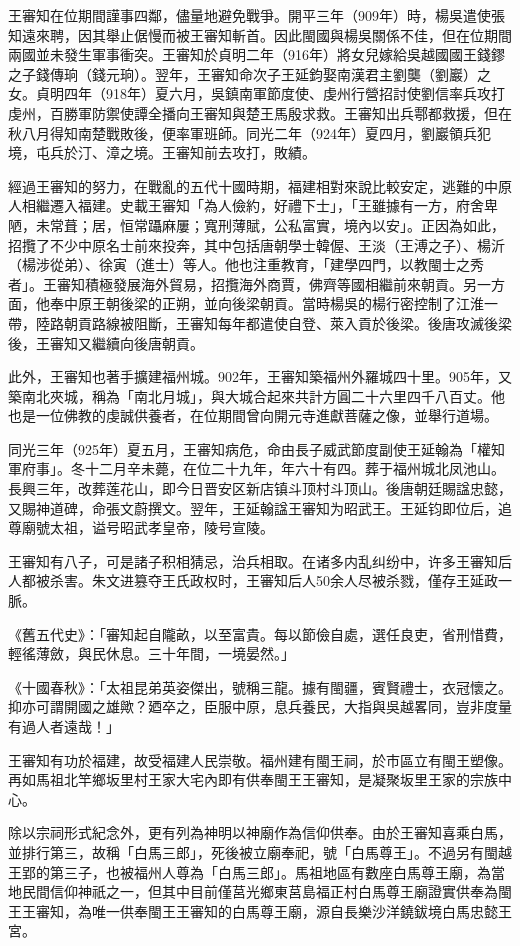 王審知在位期間謹事四鄰，儘量地避免戰爭。開平三年（909年）時，楊吳遣使張知遠來聘，因其舉止倨慢而被王審知斬首。因此閩國與楊吳關係不佳，但在位期間兩國並未發生軍事衝突。王審知於貞明二年（916年）將女兒嫁給吳越國國王錢鏐之子錢傳珦（錢元珦）。翌年，王審知命次子王延鈞娶南漢君主劉龑（劉巖）之女。貞明四年（918年）夏六月，吳鎮南軍節度使、虔州行營招討使劉信率兵攻打虔州，百勝軍防禦使譚全播向王審知與楚王馬殷求救。王審知出兵鄠都救援，但在秋八月得知南楚戰敗後，便率軍班師。同光二年（924年）夏四月，劉巖領兵犯境，屯兵於汀、漳之境。王審知前去攻打，敗績。

經過王審知的努力，在戰亂的五代十國時期，福建相對來說比較安定，逃難的中原人相繼遷入福建。史載王審知「為人儉約，好禮下士」，「王雖據有一方，府舍卑陋，未常葺；居，恒常躡麻屢；寬刑薄賦，公私富實，境內以安」。正因為如此，招攬了不少中原名士前來投奔，其中包括唐朝學士韓偓、王淡（王溥之子）、楊沂（楊涉從弟）、徐寅（進士）等人。他也注重教育，「建學四門，以教閩士之秀者」。王審知積極發展海外貿易，招攬海外商賈，佛齊等國相繼前來朝貢。另一方面，他奉中原王朝後梁的正朔，並向後梁朝貢。當時楊吳的楊行密控制了江淮一帶，陸路朝貢路線被阻斷，王審知每年都遣使自登、萊入貢於後梁。後唐攻滅後梁後，王審知又繼續向後唐朝貢。

此外，王審知也著手擴建福州城。902年，王審知築福州外羅城四十里。905年，又築南北夾城，稱為「南北月城」，與大城合起來共計方圓二十六里四千八百丈。他也是一位佛教的虔誠供養者，在位期間曾向開元寺進獻菩薩之像，並舉行道場。

同光三年（925年）夏五月，王審知病危，命由長子威武節度副使王延翰為「權知軍府事」。冬十二月辛未薨，在位二十九年，年六十有四。葬于福州城北凤池山。長興三年，改葬莲花山，即今日晋安区新店镇斗顶村斗顶山。後唐朝廷賜諡忠懿，又賜神道碑，命張文蔚撰文。翌年，王延翰諡王審知为昭武王。王延钧即位后，追尊廟號太祖，谥号昭武孝皇帝，陵号宣陵。

王審知有八子，可是諸子积相猜忌，治兵相取。在诸多内乱纠纷中，许多王審知后人都被杀害。朱文进篡夺王氏政权时，王審知后人50余人尽被杀戮，僅存王延政一脈。

《舊五代史》：「審知起自隴畝，以至富貴。每以節儉自處，選任良吏，省刑惜費，輕徭薄斂，與民休息。三十年間，一境晏然。」

《十國春秋》：「太祖昆弟英姿傑出，號稱三龍。據有閩疆，賓賢禮士，衣冠懷之。抑亦可謂開國之雄歟？廼卒之，臣服中原，息兵養民，大指與吳越畧同，豈非度量有過人者遠哉！」

王審知有功於福建，故受福建人民崇敬。福州建有閩王祠，於市區立有閩王塑像。再如馬祖北竿鄉坂里村王家大宅內即有供奉閩王王審知，是凝聚坂里王家的宗族中心。

除以宗祠形式紀念外，更有列為神明以神廟作為信仰供奉。由於王審知喜乘白馬，並排行第三，故稱「白馬三郎」，死後被立廟奉祀，號「白馬尊王」。不過另有閩越王郢的第三子，也被福州人尊為「白馬三郎」。馬祖地區有數座白馬尊王廟，為當地民間信仰神祇之一，但其中目前僅莒光鄉東莒島福正村白馬尊王廟證實供奉為閩王王審知，為唯一供奉閩王王審知的白馬尊王廟，源自長樂沙洋鐃鈸境白馬忠懿王宮。

